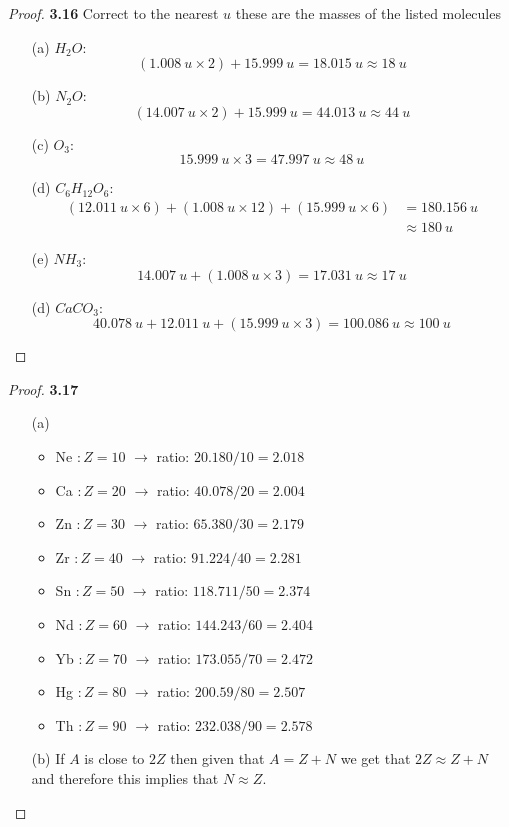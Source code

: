 \documentclass[11pt]{article}
\theoremstyle{definition}
\begin{document}
\begin{proof}{\textbf{3.16}}
Correct to the nearest $u$ these are the masses of the listed molecules
\begin{itemize}
    \item [(a)] $H_2O$:
    $$(1.008~u \times 2) + 15.999~u =  18.015~u \approx 18~u$$
    \item [(b)] $N_2O$:
    $$(14.007~u \times 2) + 15.999~u =  44.013~u \approx 44~u$$
    \item [(c)]
    $O_3$: 
    $$15.999~u \times 3 = 47.997~u \approx 48~u$$
    \item [(d)] $C_6H_{12}O_6$:
    \begin{align*}
        (12.011~u \times 6) + (1.008~u \times 12) + (15.999~u \times 6)
        &= 180.156~u \\
        &\approx 180~u
    \end{align*}
    \item [(e)] $NH_{3}$:
    $$14.007~u + (1.008~u \times 3) =  17.031~u \approx 17~u$$
    \item [(d)] $CaCO_{3}$:
    $$40.078~u + 12.011~u + (15.999~u \times 3) =  100.086~u \approx 100~u$$
\end{itemize}
\end{proof}
\begin{proof}{\textbf{3.17}}
\begin{itemize}
    \item [(a)]
    \begin{itemize}
        \item Ne $: Z = 10$ $\rightarrow$ ratio: $20.180 / 10 = 2.018$
        \item Ca $: Z = 20$ $\rightarrow$ ratio: $40.078 / 20 = 2.004$
        \item Zn $: Z = 30$ $\rightarrow$ ratio: $65.380 / 30 = 2.179$
        \item Zr $: Z = 40$ $\rightarrow$ ratio: $91.224 / 40 = 2.281$
        \item Sn $: Z = 50$ $\rightarrow$ ratio: $118.711 / 50 = 2.374$
        \item Nd $: Z = 60$ $\rightarrow$ ratio: $144.243 / 60 = 2.404$
        \item Yb $: Z = 70$ $\rightarrow$ ratio: $173.055 / 70 = 2.472$
        \item Hg $: Z = 80$ $\rightarrow$ ratio: $200.59 / 80 = 2.507$
        \item Th $: Z = 90$ $\rightarrow$ ratio: $232.038 / 90 = 2.578$
    \end{itemize}
    \item [(b)] If $A$ is close to $2Z$ then given that $A = Z + N$ we get that
    $2Z \approx Z + N$ and therefore this implies that $N \approx Z$.
\end{itemize}
\end{proof}
\end{document}
